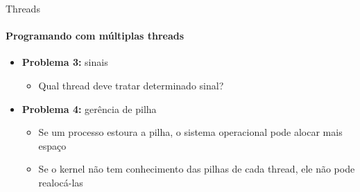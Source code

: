 \documentclass{beamer}
\begin{document}
\begin{frame}{Threads}
	\framesubtitle{Programando com múltiplas threads}
	\begin{itemize}
		\item \textbf{Problema 3:} sinais
		\begin{itemize}
			\item Qual thread deve tratar determinado sinal?
		\end{itemize}
		\item \textbf{Problema 4:} gerência de pilha
		\begin{itemize}
			\item Se um processo estoura a pilha, o sistema operacional pode alocar mais espaço
			\item Se o kernel não tem conhecimento das pilhas de cada thread, ele não pode realocá-las
		\end{itemize}
	\end{itemize}
\end{frame}
\end{document}
